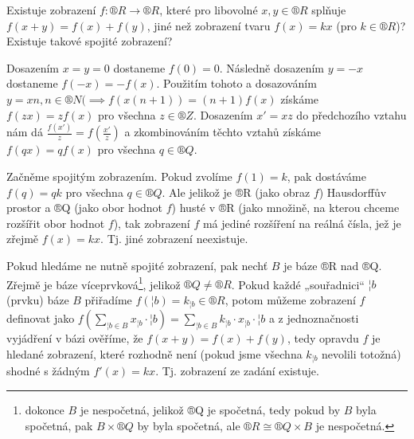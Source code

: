 \documentclass[12pt]{article}					%
\begin{document}
    \begin{priklad}[10.*]
        Existuje zobrazení $f: ®R \rightarrow ®R$, které pro libovolné $x, y \in ®R$ splňuje $f(x+y) = f(x) + f(y)$, jiné než zobrazení tvaru $f(x) = kx$ (pro $k \in ®R$)? Existuje takové spojité zobrazení?
        
        \begin{reseni}
            Dosazením $x = y = 0$ dostaneme $f(0) = 0$. Následně dosazením $y=-x$ dostaneme $f(-x) = -f(x)$. Použitím tohoto a dosazováním $y = xn, n \in ®N (\implies f(x(n+1)) = (n+1)f(x)$ získáme $f(zx) = zf(x)$ pro všechna $z \in ®Z$. Dosazením $x' = xz$ do předchozího vztahu nám dá $\frac{f(x')}{z} = f(\frac{x'}{z})$ a zkombinováním těchto vztahů získáme $f(qx) = qf(x)$ pro všechna $q \in ®Q$.

            Začněme spojitým zobrazením. Pokud zvolíme $f(1) = k$, pak dostáváme $f(q) = qk$ pro všechna $q \in ®Q$. Ale jelikož je ®R (jako obraz $f$) Hausdorffův prostor a ®Q (jako obor hodnot $f$) husté v ®R (jako množině, na kterou chceme rozšířit obor hodnot $f$), tak zobrazení $f$ má jediné rozšíření na reálná čísla, jež je zřejmě $f(x) = kx$. Tj. jiné zobrazení neexistuje.

            Pokud hledáme ne nutně spojité zobrazení, pak nechť $B$ je báze ®R nad ®Q. Zřejmě je báze víceprvková\footnote{dokonce $B$ je nespočetná, jelikož ®Q je spočetná, tedy pokud by $B$ byla spočetná, pak $B \times ®Q$ by byla spočetná, ale $®R\cong ®Q \times B$ je nespočetná.}, jelikož $®Q ≠ ®R$. Pokud každé „souřadnici“ $¦b$ (prvku) báze $B$ přiřadíme $f(¦b) = k_{¦b} \in ®R$, potom můžeme zobrazení $f$ definovat jako $f(\sum_{¦b \in B} x_{¦b}·¦b) = \sum_{¦b \in B} k_{¦b}·x_{¦b}·¦b$ a z jednoznačnosti vyjádření v bázi ověříme, že $f(x + y) = f(x) + f(y)$, tedy opravdu $f$ je hledané zobrazení, které rozhodně není (pokud jsme všechna $k_{¦b}$ nevolili totožná) shodné s žádným $f'(x) = kx$. Tj. zobrazení ze zadání existuje.
        \end{reseni}
    \end{priklad}
\end{document}
